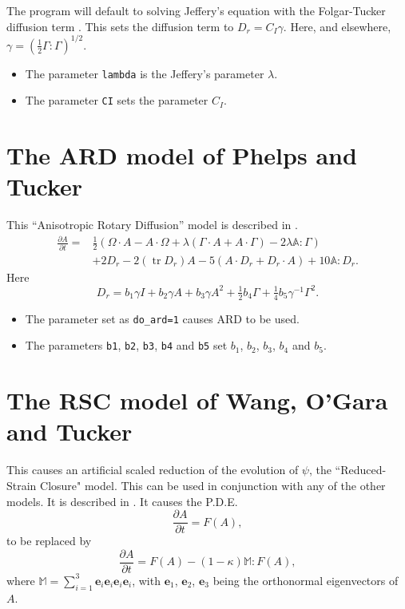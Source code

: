 \documentclass{amsart}
\newcommand{\e}{{\mathbf e}}
\newcommand\tr{\mathop{\text{tr}}}
\begin{document}
\noindent
The program will default to solving Jeffery's equation with the Folgar-Tucker diffusion term \cite{folgar}.  This sets the diffusion term to $ D_r = C_I \gamma $.
Here, and elsewhere, $\gamma = \left(\frac12\Gamma:\Gamma\right)^{1/2}$.
\begin{itemize}
\item The parameter {\tt lambda} is the Jeffery's parameter $\lambda$.
\item The parameter {\tt CI} sets the parameter $C_I$.
\end{itemize}

\section*{The ARD model of Phelps and Tucker}

\noindent
This ``Anisotropic Rotary Diffusion'' model is described in \cite{ard}.
\begin{align*}
\frac {\partial A}{\partial t} = &\tfrac12(\Omega\cdot A - A\cdot\Omega + \lambda(\Gamma\cdot A+A\cdot \Gamma) - 2 \lambda \mathbb A:\Gamma) \\
& + 2D_r -2(\tr D_r)A - 5(A\cdot D_r+D_r\cdot A) + 10 \mathbb A:D_r .
\end{align*}
Here
$$ D_r = b_1 \gamma I + b_2 \gamma A + b_3 \gamma A^2 + \tfrac12{b_4} \Gamma + \tfrac14{b_5}\gamma^{-1} \Gamma^2 .$$

\begin{itemize}
\item The parameter set as {\tt do\_ard=1} causes ARD to be used.
\item The parameters {\tt b1}, {\tt b2}, {\tt b3}, {\tt b4} and {\tt b5} set $b_1$, $b_2$, $b_3$, $b_4$ and $b_5$.
\end{itemize}

\section*{The RSC model of Wang, O'Gara and Tucker}

\noindent
This causes an artificial scaled reduction of the evolution of $\psi$, the ``Reduced-Strain Closure" model.  This can be used in conjunction with any of the other models.  It is described in \cite{rsc}.  It causes the P.D.E.\ 
$$ \frac{\partial A}{\partial t} = F(A),$$
to be replaced by
$$ \frac{\partial A}{\partial t} = F(A) - (1-\kappa)\mathbb M: F(A),$$
where $\mathbb M = \sum_{i=1}^3 \e_i\e_i\e_i\e_i$, with $\e_1$, $\e_2$, $\e_3$ being the orthonormal eigenvectors of $A$.
\end{document}
